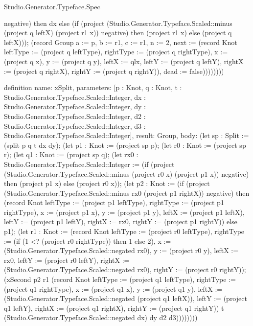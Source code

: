 \begin{lexlean}{Studio.Generator.Typeface.Spec}
\begin{semanticmodule}
{negative) then dx else (if (project (Studio.Generator.Typeface.Scaled::minus (project q leftX) (project r1 x)) negative) then (project r1 x) else (project q leftX))); (record Group {a := p, b := r1, c := r1, n := 2, next := (record Knot {leftType := (project q leftType), rightType := (project q rightType), x := (project q x), y := (project q y), leftX := qlx, leftY := (project q leftY), rightX := (project q rightX), rightY := (project q rightY)}), dead := false}))))))))
}

definition{
  name: xSplit,
  parameters: [p : Knot, q : Knot, t : Studio.Generator.Typeface.Scaled::Integer, dx : Studio.Generator.Typeface.Scaled::Integer, dy : Studio.Generator.Typeface.Scaled::Integer, d2 : Studio.Generator.Typeface.Scaled::Integer, d3 : Studio.Generator.Typeface.Scaled::Integer],
  result: Group,
  body: (let sp : Split := (split p q t dx dy); (let p1 : Knot := (project sp p); (let r0 : Knot := (project sp r); (let q1 : Knot := (project sp q); (let rx0 : Studio.Generator.Typeface.Scaled::Integer := (if (project (Studio.Generator.Typeface.Scaled::minus (project r0 x) (project p1 x)) negative) then (project p1 x) else (project r0 x)); (let p2 : Knot := (if (project (Studio.Generator.Typeface.Scaled::minus rx0 (project p1 rightX)) negative) then (record Knot {leftType := (project p1 leftType), rightType := (project p1 rightType), x := (project p1 x), y := (project p1 y), leftX := (project p1 leftX), leftY := (project p1 leftY), rightX := rx0, rightY := (project p1 rightY)}) else p1); (let r1 : Knot := (record Knot {leftType := (project r0 leftType), rightType := (if (1 <? (project r0 rightType)) then 1 else 2), x := (Studio.Generator.Typeface.Scaled::negated rx0), y := (project r0 y), leftX := rx0, leftY := (project r0 leftY), rightX := (Studio.Generator.Typeface.Scaled::negated rx0), rightY := (project r0 rightY)}); (xSecond p2 r1 (record Knot {leftType := (project q1 leftType), rightType := (project q1 rightType), x := (project q1 x), y := (project q1 y), leftX := (Studio.Generator.Typeface.Scaled::negated (project q1 leftX)), leftY := (project q1 leftY), rightX := (project q1 rightX), rightY := (project q1 rightY)}) t (Studio.Generator.Typeface.Scaled::negated dx) dy d2 d3))))))))
}


\end{semanticmodule}
\end{lexlean}
